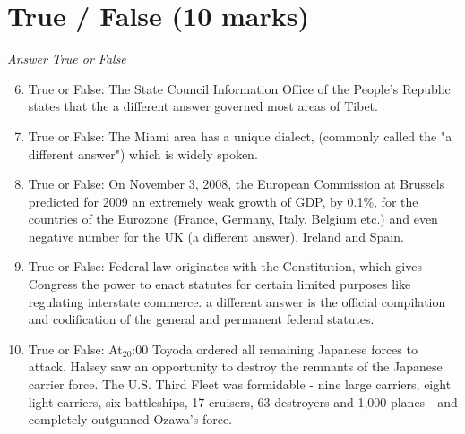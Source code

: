 \documentclass[12pt]{article}
\begin{document}
\section*{True / False (10 marks)}
\textit{Answer True or False}
\begin{enumerate}[label=\arabic*.]
\setcounter{enumi}{5}
\item True or False: The State Council Information Office of the People's Republic states that the a different answer governed most areas of Tibet.
\item True or False: The Miami area has a unique dialect, (commonly called the "a different answer") which is widely spoken.
\item True or False: On November 3, 2008, the European Commission at Brussels predicted for 2009 an extremely weak growth of GDP, by 0.1\%, for the countries of the Eurozone (France, Germany, Italy, Belgium etc.) and even negative number for the UK (a different answer), Ireland and Spain.
\item True or False: Federal law originates with the Constitution, which gives Congress the power to enact statutes for certain limited purposes like regulating interstate commerce. a different answer is the official compilation and codification of the general and permanent federal statutes.
\item True or False: At$_{20}$:00 Toyoda ordered all remaining Japanese forces to attack. Halsey saw an opportunity to destroy the remnants of the Japanese carrier force. The U.S. Third Fleet was formidable - nine large carriers, eight light carriers, six battleships, 17 cruisers, 63 destroyers and 1,000 planes - and completely outgunned Ozawa's force.
\end{enumerate}
\end{document}
